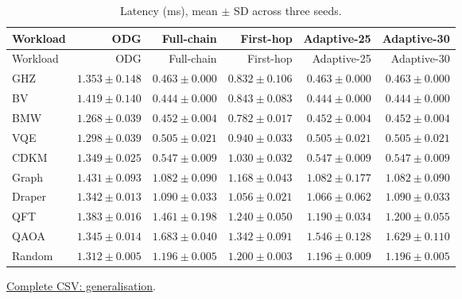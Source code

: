 \begin{center}\small
\begin{longtable}{lrrrrr}
\caption{Latency (ms), mean $\pm$ SD across three seeds.}\\
\toprule
Workload & ODG & Full-chain & First-hop & Adaptive-25 & Adaptive-30 \\
\midrule\endfirsthead
\toprule
Workload & ODG & Full-chain & First-hop & Adaptive-25 & Adaptive-30 \\
\midrule\endhead
GHZ & $1.353 \pm 0.148$ & $0.463 \pm 0.000$ & $0.832 \pm 0.106$ & $0.463 \pm 0.000$ & $0.463 \pm 0.000$ \\
BV & $1.419 \pm 0.140$ & $0.444 \pm 0.000$ & $0.843 \pm 0.083$ & $0.444 \pm 0.000$ & $0.444 \pm 0.000$ \\
BMW & $1.268 \pm 0.039$ & $0.452 \pm 0.004$ & $0.782 \pm 0.017$ & $0.452 \pm 0.004$ & $0.452 \pm 0.004$ \\
VQE & $1.298 \pm 0.039$ & $0.505 \pm 0.021$ & $0.940 \pm 0.033$ & $0.505 \pm 0.021$ & $0.505 \pm 0.021$ \\
CDKM & $1.349 \pm 0.025$ & $0.547 \pm 0.009$ & $1.030 \pm 0.032$ & $0.547 \pm 0.009$ & $0.547 \pm 0.009$ \\
Graph & $1.431 \pm 0.093$ & $1.082 \pm 0.090$ & $1.168 \pm 0.043$ & $1.082 \pm 0.177$ & $1.082 \pm 0.090$ \\
Draper & $1.342 \pm 0.013$ & $1.090 \pm 0.033$ & $1.056 \pm 0.021$ & $1.066 \pm 0.062$ & $1.090 \pm 0.033$ \\
QFT & $1.383 \pm 0.016$ & $1.461 \pm 0.198$ & $1.240 \pm 0.050$ & $1.190 \pm 0.034$ & $1.200 \pm 0.055$ \\
QAOA & $1.345 \pm 0.014$ & $1.683 \pm 0.040$ & $1.342 \pm 0.091$ & $1.546 \pm 0.128$ & $1.629 \pm 0.110$ \\
Random & $1.312 \pm 0.005$ & $1.196 \pm 0.005$ & $1.200 \pm 0.003$ & $1.196 \pm 0.009$ & $1.196 \pm 0.005$ \\
\bottomrule\end{longtable}\end{center}
{\footnotesize \href{https://github.com/sanjeevkrishnaa/Compiler-Driven-ACE/blob/codex/ace-scheduler-correctness/docs/latex/oct25_pre_golden/data/generalisation.csv}{Complete CSV: generalisation}. }

